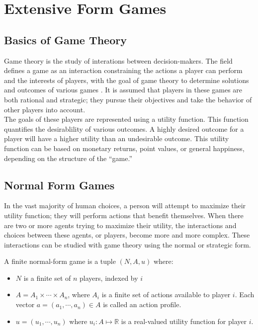 \chapter{Extensive Form Games}
\section{Basics of Game Theory}
Game theory is the study of interations between decision-makers. The field defines a game as an interaction constraining the actions a player can perform and the interests of players, with the goal of game theory to determine solutions and outcomes of various games \cite{osbo94}. It is assumed that players in these games are both rational and strategic; they pursue their objectives and take the behavior of other players into account.\\

The goals of these players are represented using a utility function. This function quantifies the desirablility of various outcomes. A highly desired outcome for a player will have a higher utility than an undesirable outcome. This utility function can be based on monetary returns, point values, or general happiness, depending on the structure of the ``game.''
\section{Normal Form Games}
In the vast majority of human choices, a person will attempt to maximize their utility function; they will perform actions that benefit themselves. When there are two or more agents trying to maximize their utility, the interactions and choices between these agents, or players, become more and more complex. These interactions can be studied with game theory using the normal or strategic form.
\begin{define}
  A finite normal-form game is a tuple $(N, A, u)$ where:
  \begin{itemize}
  \item $N$ is a finite set of $n$ players, indexed by $i$
  \item $A=A_1\times\cdots\times A_n$, where $A_i$ is a finite set of actions available to player $i$. Each vector $a=(a_1,\cdots ,a_n)\in A$ is called an action profile.
    \item $u=(u_1,\cdots ,u_n)$ where $u_i : A \mapsto\mathbb{R}$ is a real-valued utility function for player $i$.
\end{itemize}
\end{define}

